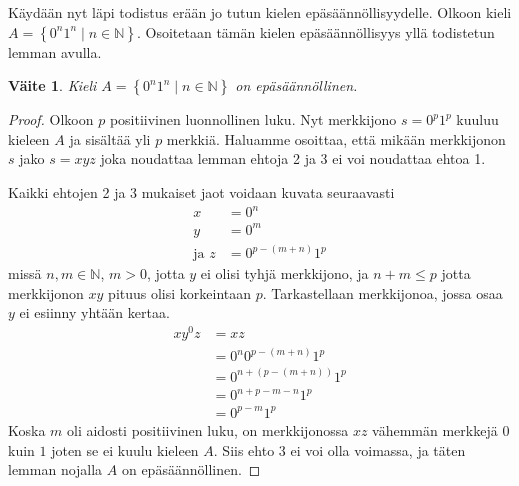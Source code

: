 \documentclass[a4paper,11pt]{article}
\newtheorem*{claim}{Väite}
\theoremstyle{definition}
\newcommand{\set}[1]{{\left\{ #1 \right\}}}
\newcommand{\Nat}{\mathbb{N}}
\begin{document}
Käydään nyt läpi todistus erään jo tutun kielen epäsäännöllisyydelle.
Olkoon kieli $A = \set{0^n1^n \mid n \in \Nat}$. Osoitetaan tämän
kielen epäsäännöllisyys yllä todistetun lemman avulla.
%
\begin{claim}
    Kieli $A = \set{0^n1^n \mid n \in \Nat}$ on epäsäännöllinen.
\end{claim}
\begin{proof}
    Olkoon $p$ positiivinen luonnollinen luku. Nyt merkkijono $s =
    0^p1^p$ kuuluu kieleen $A$ ja sisältää yli $p$ merkkiä. Haluamme
    osoittaa, että mikään merkkijonon $s$ jako $s = xyz$ joka
    noudattaa lemman ehtoja 2 ja 3 ei voi noudattaa ehtoa 1.

    Kaikki ehtojen 2 ja 3 mukaiset jaot voidaan kuvata seuraavasti
    \begin{align*}
      x & = 0^n \\
      y & = 0^m \\
      \text{ja } z & = 0^{p-(m+n)}1^p
    \end{align*}
    missä $n,m \in \Nat$, $m > 0$, jotta $y$ ei olisi tyhjä
    merkkijono, ja $n + m \le p$ jotta merkkijonon $xy$ pituus olisi
    korkeintaan $p$. Tarkastellaan merkkijonoa, jossa osaa $y$ ei
    esiinny yhtään kertaa.
    \begin{align*}
      xy^0z & = xz \\
      & = 0^n0^{p-(m+n)}1^p \\
      & = 0^{n+(p-(m+n))}1^p \\
      & = 0^{n+p-m-n}1^p \\
      & = 0^{p-m}1^p
    \end{align*}
    Koska $m$ oli aidosti positiivinen luku, on merkkijonossa $xz$
    vähemmän merkkejä $0$ kuin $1$ joten se ei kuulu kieleen $A$. Siis
    ehto 3 ei voi olla voimassa, ja täten lemman nojalla $A$ on
    epäsäännöllinen.
\end{proof}
\end{document}
